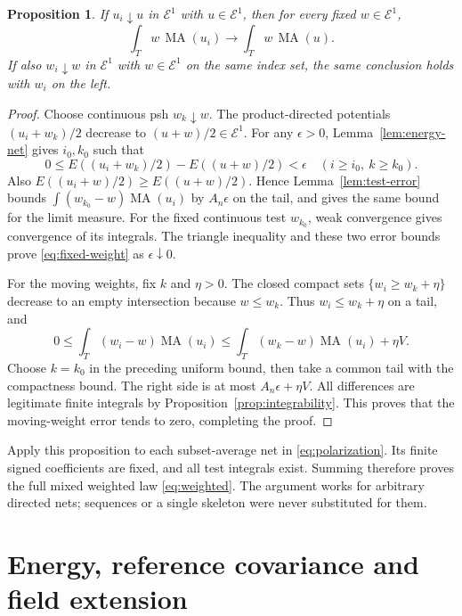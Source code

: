 \documentclass[11pt]{article}
\newtheorem{proposition}[theorem]{Proposition}
\newcommand{\MA}{\operatorname{MA}}
\newcommand{\E}{\mathcal E}
\begin{document}
\begin{proposition}\label{prop:weighted-pure}
If $u_i\downarrow u$ in $\E^1$ with $u\in\E^1$, then for
every fixed $w\in\E^1$,
\begin{equation}\label{eq:fixed-weight}
 \int_Tw\,\MA(u_i)\longrightarrow\int_Tw\,\MA(u).
\end{equation}
If also $w_i\downarrow w$ in $\E^1$ with $w\in\E^1$ on the
same index set, the same conclusion holds with $w_i$ on the left.
\end{proposition}
\begin{proof}
Choose continuous psh $w_k\downarrow w$. The product-directed
potentials $(u_i+w_k)/2$ decrease to $(u+w)/2\in\E^1$.
For any $\epsilon>0$, Lemma~\ref{lem:energy-net} gives $i_0,k_0$
such that
\[
 0\leq E((u_i+w_k)/2)-E((u+w)/2)<\epsilon
               \quad(i\geq i_0,\ k\geq k_0).
\]
Also $E((u_i+w)/2)\geq E((u+w)/2)$. Hence
Lemma~\ref{lem:test-error} bounds
$\int(w_{k_0}-w)\MA(u_i)$ by $A_n\epsilon$ on the tail,
and gives the same bound for the limit measure. For the fixed
continuous test $w_{k_0}$, weak convergence gives convergence of
its integrals. The triangle inequality and these two error bounds
prove \eqref{eq:fixed-weight} as $\epsilon\downarrow0$.

For the moving weights, fix $k$ and $\eta>0$. The closed compact
sets $\{w_i\geq w_k+\eta\}$ decrease to an empty intersection
because $w\leq w_k$. Thus $w_i\leq w_k+\eta$ on a tail, and
\[
 0\leq\int_T(w_i-w)\MA(u_i)
       \leq\int_T(w_k-w)\MA(u_i)+\eta V.
\]
Choose $k=k_0$ in the preceding uniform bound, then take a common
tail with the compactness bound. The right side is at most
$A_n\epsilon+\eta V$. All differences are legitimate finite
integrals by Proposition~\ref{prop:integrability}. This proves
that the moving-weight error tends to zero, completing the proof.
\end{proof}

Apply this proposition to each subset-average net in
\eqref{eq:polarization}. Its finite signed coefficients are fixed,
and all test integrals exist. Summing therefore proves the full
mixed weighted law \eqref{eq:weighted}. The argument works for
arbitrary directed nets; sequences or a single skeleton were never
substituted for them.

\section{Energy, reference covariance and field extension}
\end{document}
